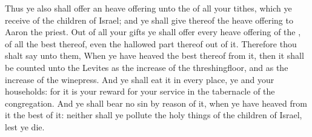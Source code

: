 \begin{biblechapter}
\verse Thus ye also shall offer an heave offering unto the \LORD of all your tithes, which ye receive of the children of Israel; and ye shall give thereof the \LORDs heave offering to Aaron the priest.
\verse Out of all your gifts ye shall offer every heave offering of the \LORD, of all the best thereof, even the hallowed part thereof out of it.
\verse Therefore thou shalt say unto them, When ye have heaved the best thereof from it, then it shall be counted unto the Levites as the increase of the threshingfloor, and as the increase of the winepress.
\verse And ye shall eat it in every place, ye and your households: for it is your reward for your service in the tabernacle of the congregation.
\verse And ye shall bear no sin by reason of it, when ye have heaved from it the best of it: neither shall ye pollute the holy things of the children of Israel, lest ye die.
\end{biblechapter}

